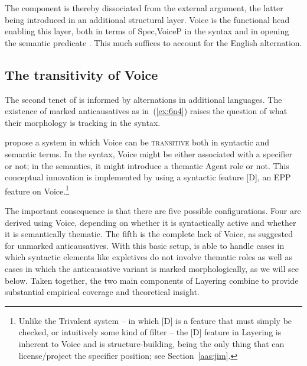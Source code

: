 \begin{exe}
\begin{xlist}
\begin{exe}
\begin{exe}
\begin{xlist}
The  component is thereby dissociated from the external argument, the latter being introduced in an additional structural layer. Voice is the functional head enabling this layer, both in terms of  Spec,VoiceP in the syntax and in opening the semantic predicate . This much suffices to account for the English alternation.

	\subsection{The transitivity of Voice} \label{aas:layering:features}\largerpage[2]
The second tenet of  is informed by alternations in additional languages. The existence of marked anticausatives as in~(\ref{ex:6n4}) raises the question of what their morphology is tracking in the syntax.
 \begin{exe}
	
 \z 

\cite{layering15} propose a system in which Voice can be \textsc{transitive} both in syntactic and semantic terms. In the syntax, Voice might be either associated with a specifier or not; in the semantics, it might introduce a thematic Agent role or not. This conceptual innovation is implemented by using a syntactic feature [D], an EPP feature on Voice.\footnote{Unlike the Trivalent system -- in which [D] is a feature that must simply be checked, or intuitively some kind of filter -- the [D] feature in Layering is inherent to Voice and is structure-building, being the only thing that can license/project the specifier position; see Section~\ref{aas:jim}.}

The important consequence is that there are five possible configurations. Four are derived using Voice, depending on whether it is syntactically active and whether it is semantically thematic. The fifth is the complete lack of Voice, as suggested for unmarked anticausatives. With this basic setup,  is able to handle cases in which syntactic elements like expletives do not involve thematic roles as well as cases in which the anticausative variant is marked morphologically, as we will see below. Taken together, the two main components of Layering combine to provide substantial empirical coverage and theoretical insight.


\end{exe}
\end{xlist}
\end{exe}
\end{exe}
\end{xlist}
\end{exe}
